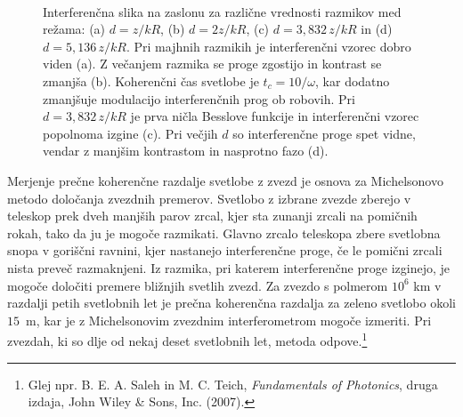 \begin{figure}[ht]
\begin{center}
\quad
{}\\
\quad
{}
\caption{Interferenčna slika na zaslonu
za različne vrednosti razmikov med režama: (a) $d = z/kR$, (b) $d=2z/kR$, 
(c) $d = 3,832\,z/kR$ in (d) $d = 5,136\,z/kR$. Pri majhnih razmikih je interferenčni vzorec
dobro viden (a).
Z večanjem razmika se proge zgostijo in kontrast se zmanjša (b). Koherenčni
čas svetlobe je $t_{c}=10/\omega$, kar dodatno zmanjšuje modulacijo
interferenčnih prog ob robovih. Pri $d=3,832\,z/kR$ je prva ničla Besslove
funkcije in interferenčni vzorec popolnoma izgine (c). Pri večjih $d$ so interferenčne
proge spet vidne, vendar z manjšim kontrastom in nasprotno fazo (d).}
\label{fig:Interferencna-slika}
\end{center}
\end{figure}

\begin{remark}
Merjenje prečne koherenčne razdalje svetlobe z
zvezd je osnova za Michelsonovo metodo določanja zvezdnih premerov.
Svetlobo z izbrane zvezde zberejo v teleskop prek dveh manjših parov
zrcal, kjer sta zunanji zrcali na pomičnih rokah, tako da ju je mogoče
razmikati. Glavno zrcalo teleskopa zbere svetlobna snopa v goriščni
ravnini, kjer nastanejo interferenčne proge, če le pomični zrcali
nista preveč razmaknjeni. Iz razmika, pri katerem interferenčne proge
izginejo, je mogoče določiti premere bližnjih svetlih zvezd. Za zvezdo
s polmerom $10^{6}$ km v razdalji petih svetlobnih let je prečna koherenčna
razdalja za zeleno svetlobo okoli $15$~m, kar je z Michelsonovim
zvezdnim interferometrom mogoče izmeriti. Pri zvezdah, ki so dlje
od nekaj deset svetlobnih let, metoda odpove.\footnote{Glej npr. B. E. A. Saleh in M. C. Teich, 
{\it Fundamentals of Photonics}, druga izdaja, John Wiley \& Sons, Inc. (2007).}
\end{remark}

